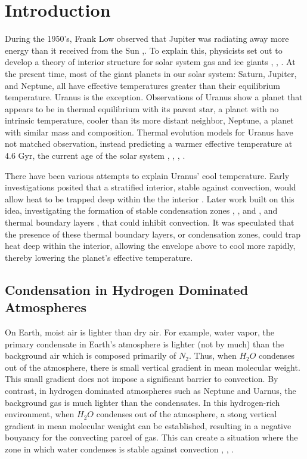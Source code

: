 \documentclass[11pt]{ucscthesisbs}
\begin{document}
\chapter{Introduction}

During the 1950's, Frank Low observed that Jupiter was radiating away more energy than it received from the Sun \citep{hubbard_1968},\citep{low_1966}. To explain this, physicists set out to develop a theory of interior structure for solar system gas and ice giants \citep{hubbard_1977}, \citep{hubbard_1977_2}, \citep{podolak_1991}. At the present time, most of the giant planets in our solar system: Saturn, Jupiter, and Neptune, all have effective temperatures greater than their equilibrium temperature. Uranus is the exception. Observations of Uranus show a planet that appears to be in thermal equilibrium with its parent star, a planet with no intrinsic temperature, cooler than its more distant neighbor, Neptune, a planet with similar mass and composition. Thermal evolution models for Uranus have not matched observation, instead predicting a warmer effective temperature at $4.6$ Gyr, the current age of the solar system \citep{fortney_2011}, \citep{podolak_1991}, \citep{hubbard_1995}, \citep{scheibe_2019}.

There have been various attempts to explain Uranus' cool temperature. Early investigations posited that a stratified interior, stable against convection, would allow heat to be trapped deep within the the interior \citep{podolak_1991}. Later work built on this idea, investigating the formation of stable condensation zones \citep{friedson_2017}, \citep{leconte_2017}, and \citep{guillot_1995}, and thermal boundary layers \citep{nettelmann_2016}, that could inhibit convection. It was speculated that the presence of these thermal boundary layers, or condensation zones, could trap heat deep within the interior, allowing the envelope above to cool more rapidly, thereby lowering the planet's effective temperature.

\section{Condensation in Hydrogen Dominated Atmospheres}
On Earth, moist air is lighter than dry air. For example, water vapor, the primary condensate in Earth's atmosphere is lighter (not by much) than the background air which is composed primarily of $N_{2}$. Thus, when $H_{2}O$ condenses out of the atmosphere, there is small vertical gradient in mean molecular weight. This small gradient does not impose a significant barrier to convection. By contrast, in hydrogen dominated atmospheres such as Neptune and Uarnus, the background gas is much lighter than the condensates. In this hydrogen-rich environment, when $H_{2}O$ condenses out of the atmosphere, a stong vertical gradient in mean molecular weaight can be established, resulting in a negative bouyancy for the convecting parcel of gas. This can create a situation where the zone in which water condenses is stable against convection \citep{guillot_1995}, \citep{friedson_2017}, \citep{leconte_2017}. 
\end{document}
